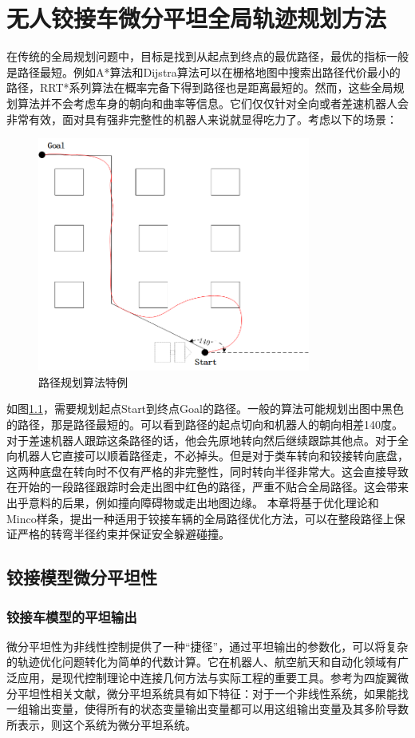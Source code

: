 \documentclass[master,academic]{ysuthesis} %
\begin{document}
	\chapter{无人铰接车微分平坦全局轨迹规划方法}
		在传统的全局规划问题中，目标是找到从起点到终点的最优路径，最优的指标一般是路径最短。例如A*算法和Dijstra算法可以在栅格地图中搜索出路径代价最小的路径，RRT*系列算法在概率完备下得到路径也是距离最短的。然而，这些全局规划算法并不会考虑车身的朝向和曲率等信息。它们仅仅针对全向或者差速机器人会非常有效，面对具有强非完整性的机器人来说就显得吃力了。考虑以下的场景：  
		\begin{figure}[!ht]
			\centering
			\includegraphics[width=0.8\textwidth]{路径规划算法特例.png}
			\caption{路径规划算法特例}
			\label{fig:路径规划算法特例}
		\end{figure}

		如图\ref{fig:路径规划算法特例}，需要规划起点Start到终点Goal的路径。一般的算法可能规划出图中黑色的路径，那是路径最短的。可以看到路径的起点切向和机器人的朝向相差140度。对于差速机器人跟踪这条路径的话，他会先原地转向然后继续跟踪其他点。对于全向机器人它直接可以顺着路径走，不必掉头。但是对于类车转向和铰接转向底盘，这两种底盘在转向时不仅有严格的非完整性，同时转向半径非常大。这会直接导致在开始的一段路径跟踪时会走出图中红色的路径，严重不贴合全局路径。这会带来出乎意料的后果，例如撞向障碍物或走出地图边缘。
		本章将基于优化理论和Minco样条，提出一种适用于铰接车辆的全局路径优化方法，可以在整段路径上保证严格的转弯半径约束并保证安全躲避碰撞。
		
	\section{铰接模型微分平坦性}
		\subsection{铰接车模型的平坦输出}
		微分平坦性为非线性控制提供了一种“捷径”，通过平坦输出的参数化，可以将复杂的轨迹优化问题转化为简单的代数计算。它在机器人、航空航天和自动化领域有广泛应用，是现代控制理论中连接几何方法与实际工程的重要工具。参考为四旋翼微分平坦性相关文献\cite{mellinger2011minimum}，微分平坦系统具有如下特征：对于一个非线性系统，如果能找一组输出变量，使得所有的状态变量输出变量都可以用这组输出变量及其多阶导数所表示，则这个系统为微分平坦系统。
\end{document}
